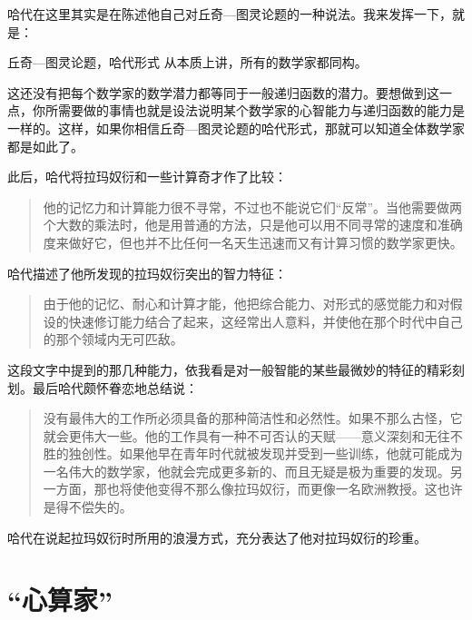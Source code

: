 哈代在这里其实是在陈述他自己对丘奇—图灵论题的一种说法。我来发挥一下，就是：

\begin{thm}[2\ccwd]{丘奇—图灵论题，哈代形式}
从本质上讲，所有的数学家都同构。
\end{thm}
这还没有把每个数学家的数学潜力都等同于一般递归函数的潜力。要想做到这一点，你所需要做的事情也就是设法说明某个数学家的心智能力与递归函数的能力是一样的。这样，如果你相信丘奇—图灵论题的哈代形式，那就可以知道全体数学家都是如此了。

此后，哈代将拉玛奴衍和一些计算奇才作了比较：

\begin{quote}
他的记忆力和计算能力很不寻常，不过也不能说它们“反常”。当他需要做两个大数的乘法时，他是用普通的方法，只是他可以用不同寻常的速度和准确度来做好它，但也并不比任何一名天生迅速而又有计算习惯的数学家更快。
\end{quote}
哈代描述了他所发现的拉玛奴衍突出的智力特征：

\begin{quote}
由于他的记忆、耐心和计算才能，他把综合能力、对形式的感觉能力和对假设的快速修订能力结合了起来，这经常出人意料，并使他在那个时代中自己的那个领域内无可匹敌。
\end{quote}
这段文字中提到的那几种能力，依我看是对一般智能的某些最微妙的特征的精彩刻划。最后哈代颇怀眷恋地总结说：

\begin{quote}
没有最伟大的工作所必须具备的那种简洁性和必然性。如果不那么古怪，它就会更伟大一些。他的工作具有一种不可否认的天赋——意义深刻和无往不胜的独创性。如果他早在青年时代就被发现并受到一些训练，他就可能成为一名伟大的数学家，他就会完成更多新的、而且无疑是极为重要的发现。另一方面，那也将使他变得不那么像拉玛奴衍，而更像一名欧洲教授。这也许是得不偿失的。
\end{quote}

哈代在说起拉玛奴衍时所用的浪漫方式，充分表达了他对拉玛奴衍的珍重。

\section{“心算家”}

